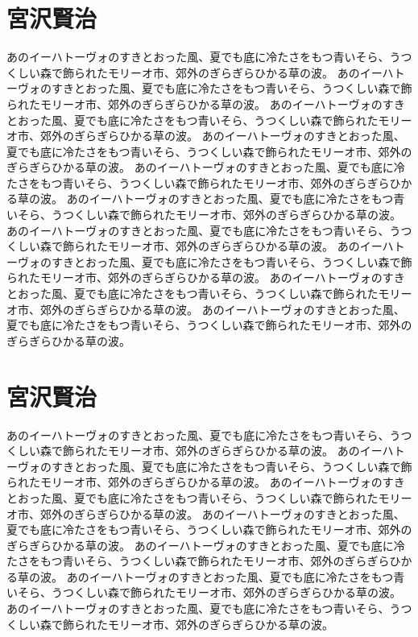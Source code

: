 \documentclass[b5j]{jsbook}
\begin{document}
\section{宮沢賢治}

あのイーハトーヴォのすきとおった風、夏でも底に冷たさをもつ青いそら、うつくしい森で飾られたモリーオ市、郊外のぎらぎらひかる草の波。
あのイーハトーヴォのすきとおった風、夏でも底に冷たさをもつ青いそら、うつくしい森で飾られたモリーオ市、郊外のぎらぎらひかる草の波。
あのイーハトーヴォのすきとおった風、夏でも底に冷たさをもつ青いそら、うつくしい森で飾られたモリーオ市、郊外のぎらぎらひかる草の波。
あのイーハトーヴォのすきとおった風、夏でも底に冷たさをもつ青いそら、うつくしい森で飾られたモリーオ市、郊外のぎらぎらひかる草の波。
あのイーハトーヴォのすきとおった風、夏でも底に冷たさをもつ青いそら、うつくしい森で飾られたモリーオ市、郊外のぎらぎらひかる草の波。
あのイーハトーヴォのすきとおった風、夏でも底に冷たさをもつ青いそら、うつくしい森で飾られたモリーオ市、郊外のぎらぎらひかる草の波。
あのイーハトーヴォのすきとおった風、夏でも底に冷たさをもつ青いそら、うつくしい森で飾られたモリーオ市、郊外のぎらぎらひかる草の波。
あのイーハトーヴォのすきとおった風、夏でも底に冷たさをもつ青いそら、うつくしい森で飾られたモリーオ市、郊外のぎらぎらひかる草の波。
あのイーハトーヴォのすきとおった風、夏でも底に冷たさをもつ青いそら、うつくしい森で飾られたモリーオ市、郊外のぎらぎらひかる草の波。
あのイーハトーヴォのすきとおった風、夏でも底に冷たさをもつ青いそら、うつくしい森で飾られたモリーオ市、郊外のぎらぎらひかる草の波。

\section{宮沢賢治}

あのイーハトーヴォのすきとおった風、夏でも底に冷たさをもつ青いそら、うつくしい森で飾られたモリーオ市、郊外のぎらぎらひかる草の波。
あのイーハトーヴォのすきとおった風、夏でも底に冷たさをもつ青いそら、うつくしい森で飾られたモリーオ市、郊外のぎらぎらひかる草の波。
あのイーハトーヴォのすきとおった風、夏でも底に冷たさをもつ青いそら、うつくしい森で飾られたモリーオ市、郊外のぎらぎらひかる草の波。
あのイーハトーヴォのすきとおった風、夏でも底に冷たさをもつ青いそら、うつくしい森で飾られたモリーオ市、郊外のぎらぎらひかる草の波。
あのイーハトーヴォのすきとおった風、夏でも底に冷たさをもつ青いそら、うつくしい森で飾られたモリーオ市、郊外のぎらぎらひかる草の波。
あのイーハトーヴォのすきとおった風、夏でも底に冷たさをもつ青いそら、うつくしい森で飾られたモリーオ市、郊外のぎらぎらひかる草の波。
あのイーハトーヴォのすきとおった風、夏でも底に冷たさをもつ青いそら、うつくしい森で飾られたモリーオ市、郊外のぎらぎらひかる草の波。
\end{document}

